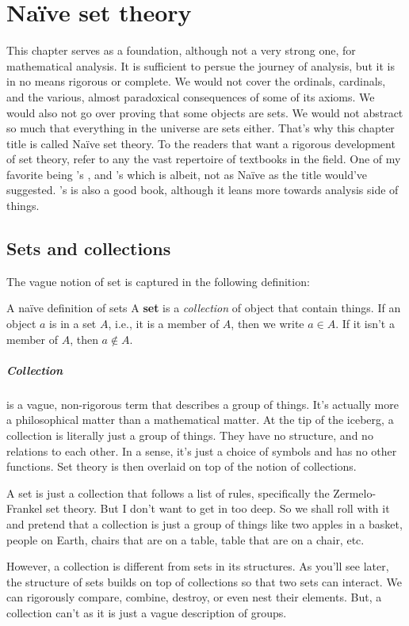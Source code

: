 \chapter{Na\"ive set theory}

This chapter serves as a foundation, although not a very strong one, for mathematical analysis. It
is sufficient to persue the journey of analysis, but it is in no means rigorous or complete. We
would not cover the ordinals, cardinals, and the various, almost paradoxical consequences of some of
its axioms. We would also not go over proving that some objects are sets. We would not abstract so
much that everything in the universe are sets either. That's why this chapter title is called
Na\"ive set theory. To the readers that want a rigorous development of set theory, refer to any the
vast repertoire of textbooks in the field. One of my favorite being
\citeauthor{enderton-set-theory}'s  \cite{enderton-set-theory}, and
\citeauthor{halmos-set-theory}'s  \cite{halmos-set-theory} which is
albeit, not as Na\"ive as the title would've suggested. \citeauthor{goldrei-1996}'s
 is also a good book, although it leans more towards analysis side of
things.

\section{Sets and collections}

The vague notion of set is captured in the following definition:

\begin{df}{A na\"ive definition of sets}{}
  A \textbf{set} is a \emph{collection} of object that contain things. If an object \(a\) is in a
  set \(A\), i.e., it is a member of \(A\), then we write \(a \in A\). If it isn't a member of
  \(A\), then \(a \notin A\).
\end{df}

\paragraph{Collection}

is a vague, non-rigorous term that describes a group of things. It's actually more a philosophical
matter than a mathematical matter. At the tip of the iceberg, a collection is literally just a group
of things. They have no structure, and no relations to each other. In a sense, it's just a choice of
symbols and has no other functions. Set theory is then overlaid on top of the notion of collections.

A set is just a collection that follows a list of rules, specifically the Zermelo-Frankel set
theory. But I don't want to get in too deep. So we shall roll with it and pretend that a collection
is just a group of things like two apples in a basket, people on Earth, chairs that are on a table,
table that are on a chair, etc.

However, a collection is different from sets in its structures. As you'll see later, the structure
of sets builds on top of collections so that two sets can interact. We can rigorously compare,
combine, destroy, or even nest their elements. But, a collection can't as it is just a vague
description of groups.
